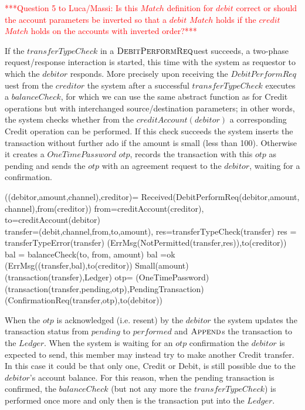 \vspace{12pt}
\textcolor{red}{***Question 5 to Luca/Massi:  Is this $Match$ definition for $debit$ correct or should the account parameters be inverted so that a $debit$ $Match$ holds if the $credit$ $Match$ holds on the accounts with inverted order?***}
\vspace{12pt}

If the $transferTypeCheck$ in a $ \hbox{\sc DebitPerformReq}$uest succeeds, a two-phase request/response interaction is started, this time with the system as requestor to which the $debitor$ responds. More precisely upon receiving the $DebitPerformReq$uest from the $creditor$ the system after a successful  $transferTypeCheck$ executes a $balanceCheck$, for which we can use the same abstract function as for Credit operations but with interchanged source/destination parameters; in other words, the system checks whether from the $creditAccount(debitor)$ a corresponding Credit operation can be performed. If this check succeeds the system inserts the transaction without further ado if the amount is small (less than 100). Otherwise it creates a $OneTimePassword$ $otp$, records the transaction with this $otp$ as pending and sends the $otp$  with an agreement request to the $debitor$, waiting for a confirmation.


\begin{asm}
((debitor,amount,channel),creditor)=\+
\IF  Received(DebitPerformReq(debitor,amount, channel),from(creditor)) \THEN \+     
  \LET from=creditAccount(creditor), to=creditAccount(debitor)\\
  \LET transfer=(debit,channel,from,to,amount), res=transferTypeCheck(transfer) \+
  \IF res = transferTypeError(transfer) \THEN \+                       (ErrMsg(NotPermitted(transfer,res)),to(creditor))\-
  \ELSE~ \LET bal = balanceCheck(to, from, amount) \+
       \IF bal \not =ok \THEN ~ (ErrMsg((transfer,bal),to(creditor))   \ELSE \+
         \IF Small(amount) \THEN ~ (transaction(transfer),Ledger) \ELSE \+
           \LET otp= \NEW(OneTimePassword)\+
             (transaction(transfer,pending,otp),PendingTransaction)\\   (ConfirmationReq(transfer,otp),to(debitor))
\end{asm}
             
When the $otp$ is acknowledged (i.e. resent) by the $debitor$ 
the system updates the transaction status from $pending$ to $performed$ and 
$\hbox{\sc Append}$s the transaction to the $Ledger$. When the system is waiting for an $otp$ confirmation the $debitor$ is expected to send, this member may instead try to make another Credit transfer. In this case it could be that only one, Credit or Debit, is still possible due to the $debitor$'s account balance. For this reason, when the pending transaction is confirmed, the $balanceCheck$  (but not any more the $transferTypeCheck$) is performed once more and only then is the transaction put into the $Ledger$.  
              
